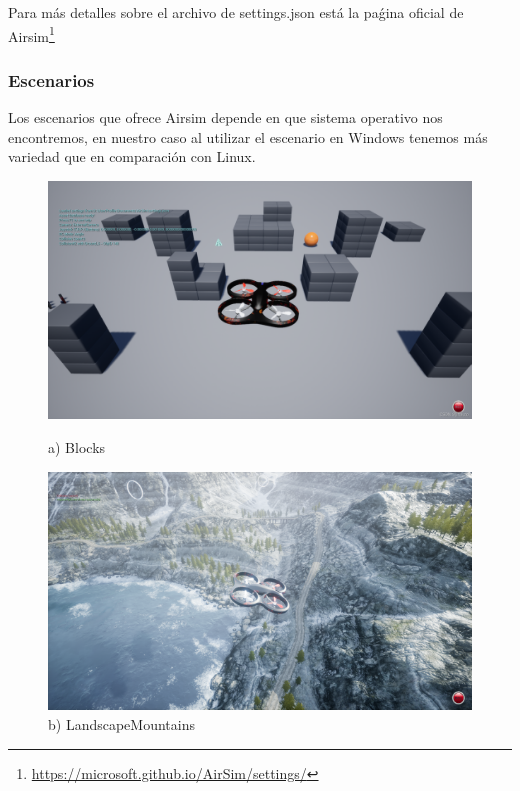 Para más detalles sobre el archivo de settings.json está la paǵina oficial de Airsim\footnote{\url{https://microsoft.github.io/AirSim/settings/}} \newline

\subsubsection{Escenarios}
\label{sec:airsim}
Los escenarios que ofrece Airsim depende en que sistema operativo nos encontremos, en nuestro caso al utilizar el escenario en Windows 
tenemos más variedad que en comparación con Linux. \newline

\begin{figure}[H]
  \centering
  \begin{minipage}{0.5\textwidth}
      \centering
      \includegraphics[width=\linewidth]{figs/Plataformas_Desarollo/mapas_airsim/blocks.png}
      \caption*{a) Blocks}
  \end{minipage}%
  \begin{minipage}{0.5\textwidth}
      \centering
      \includegraphics[width=\linewidth]{figs/Plataformas_Desarollo/mapas_airsim/landscapemountains.png}
      \caption*{b) LandscapeMountains}
  \end{minipage}


\end{figure}

